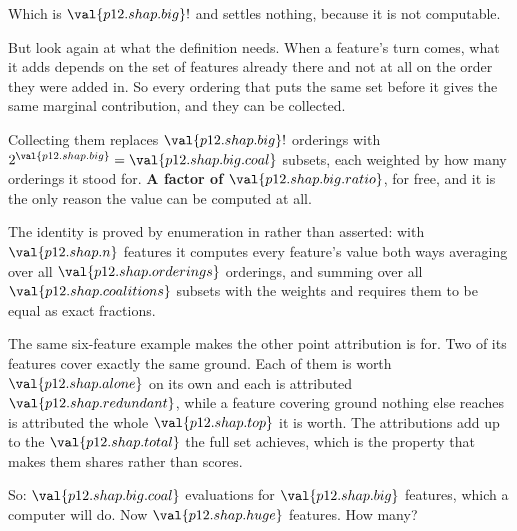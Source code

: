 \begin{fr}
Which is $\val{p12.shap.big}!$ and settles nothing, because it is not
computable.

But look again at what the definition needs. When a feature's turn comes, what
it adds depends on the set of features already there \dash{} and not at all on
the order they were added in. So every ordering that puts the same set before
it gives the same marginal contribution, and they can be collected.

Collecting them replaces $\val{p12.shap.big}!$ orderings with
$2^{\val{p12.shap.big}} = \val{p12.shap.big.coal}$ subsets, each weighted by
how many orderings it stood for. \textbf{A factor of
$\val{p12.shap.big.ratio}$}, for free, and it is the only reason the value can
be computed at all.

\end{fr}

\begin{fr}
\begin{note}
The identity is proved by enumeration in 
rather than asserted: with $\val{p12.shap.n}$ features it computes every
feature's value both ways \dash{} averaging over all
$\val{p12.shap.orderings}$ orderings, and summing over all
$\val{p12.shap.coalitions}$ subsets with the weights \dash{} and requires them
to be equal as exact fractions.

The same six-feature example makes the other point attribution is for. Two of
its features cover exactly the same ground. Each of them is worth
$\val{p12.shap.alone}$ on its own and each is attributed
$\val{p12.shap.redundant}$, while a feature covering ground nothing else
reaches is attributed the whole $\val{p12.shap.top}$ it is worth. The
attributions add up to the $\val{p12.shap.total}$ the full set achieves, which
is the property that makes them shares rather than scores.
\end{note}

So: $\val{p12.shap.big.coal}$ evaluations for $\val{p12.shap.big}$ features,
which a computer will do. Now $\val{p12.shap.huge}$ features. How many?
\nextframe
\end{fr}

